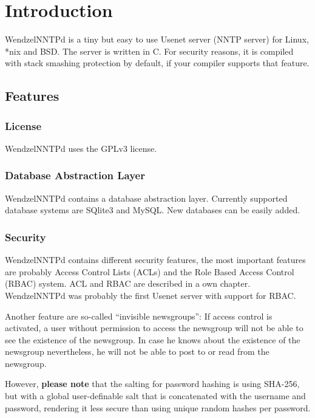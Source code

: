 \chapter{Introduction}

WendzelNNTPd is a tiny but easy to use Usenet server (NNTP server) for Linux, *nix and BSD. The server is written in C. For security reasons, it is compiled with stack smashing protection by default, if your compiler supports that feature.

\section{Features}

\subsection{License}

WendzelNNTPd uses the GPLv3 license.

\subsection{Database Abstraction Layer}

WendzelNNTPd contains a database abstraction layer. Currently supported database systems are SQlite3 and MySQL. New databases can be easily added.

\subsection{Security}

WendzelNNTPd contains different security features, the most important features are probably Access Control Lists (ACLs) and the Role Based Access Control (RBAC) system. ACL and RBAC are described in a own chapter. WendzelNNTPd was probably the first Usenet server with support for RBAC.

Another feature are so-called ``invisible newsgroups'': If access control is activated, a user without permission to access the newsgroup will not be able to see the existence of the newsgroup. In case he knows about the existence of the newsgroup nevertheless, he will not be able to post to or read from the newsgroup.

However, \textbf{please note} that the salting for password hashing is using SHA-256, but with a global user-definable salt that is concatenated with the username and password, rendering it less secure than using unique random hashes per password. 

